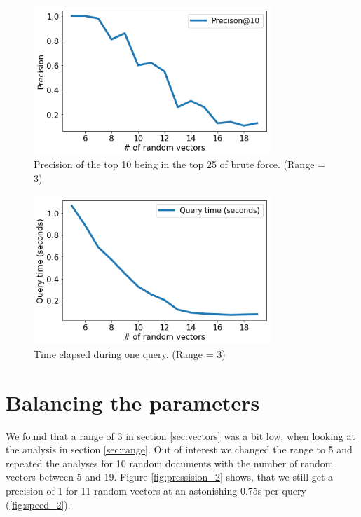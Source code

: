 \documentclass[12pt]{scrreprt}
\begin{document}
\begin{figure}[H]
  \begin{center}
    \caption{Precision of the top 10 being in the top 25 of brute force. (Range = 3)}
    \label{fig:precision}
    \includegraphics[width=0.8\textwidth, angle=0]{output/output_108_1.png}
  \end{center}
\end{figure}
\begin{figure}[H]
  \begin{center}
    \caption{Time elapsed during one query. (Range = 3)}
    \label{fig:speed}
    \includegraphics[width=0.8\textwidth, angle=0]{output/output_108_2.png}
  \end{center}
\end{figure}

\section{Balancing the parameters}
We found that a range of 3 in section \ref{sec:vectors} was a bit low, when looking at the analysis in section \ref{sec:range}. Out of interest we changed the range to 5 and repeated the analyses for 10 random documents with the number of random vectors between 5 and 19. Figure \ref{fig:pressision_2} shows, that we still get a precision of 1 for 11 random vectors at an astonishing 0.75s per query (\ref{fig:speed_2}).\\
\end{document}

